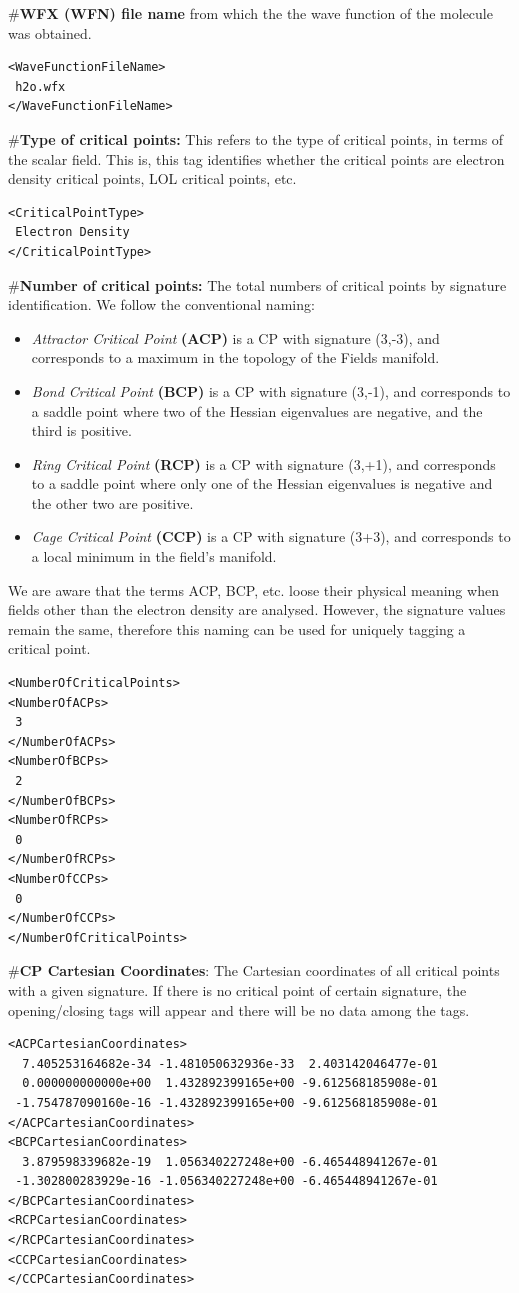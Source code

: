 \#\textbf{WFX (WFN) file name} from which the the wave function of the molecule was obtained.
\begin{verbatim}
<WaveFunctionFileName>
 h2o.wfx
</WaveFunctionFileName>
\end{verbatim}
\#\textbf{Type of critical points:} This refers to the type of critical points, in terms of the scalar field. This is, this tag identifies whether the critical points are electron density critical points, LOL critical points, etc.
\begin{verbatim}
<CriticalPointType>
 Electron Density
</CriticalPointType>
\end{verbatim}
\#\textbf{Number of critical points:} The total numbers of critical points by signature identification.
We follow the conventional naming:
\begin{itemize}
   \item \textit{Attractor Critical Point} \textbf{(ACP)} is a CP with signature (3,-3), and corresponds to a maximum in the topology of the Fields manifold.
   \item \textit{Bond Critical Point} \textbf{(BCP)} is a CP with signature (3,-1), and corresponds to a saddle point where two of the Hessian eigenvalues are negative, and the third is positive.
   \item \textit{Ring Critical Point} \textbf{(RCP)} is a CP with signature (3,+1), and corresponds to a saddle point where only one of the Hessian eigenvalues is negative and the other two are positive.
   \item \textit{Cage Critical Point} \textbf{(CCP)} is a CP with signature (3+3), and corresponds to a local minimum in the field's manifold.
\end{itemize}
We are aware that the terms ACP, BCP, etc. loose their physical meaning when fields other than the electron density are analysed. However, the signature values remain the same, therefore this naming can be used for uniquely tagging a critical point.
\begin{verbatim}
<NumberOfCriticalPoints>
<NumberOfACPs>
 3
</NumberOfACPs>
<NumberOfBCPs>
 2
</NumberOfBCPs>
<NumberOfRCPs>
 0
</NumberOfRCPs>
<NumberOfCCPs>
 0
</NumberOfCCPs>
</NumberOfCriticalPoints>
\end{verbatim}
\#\textbf{CP Cartesian Coordinates}: The Cartesian coordinates of all critical points with a given signature. If there is no critical point of certain signature, the opening/closing tags will appear and there will be no data among the tags.
\begin{verbatim}
<ACPCartesianCoordinates>
  7.405253164682e-34 -1.481050632936e-33  2.403142046477e-01
  0.000000000000e+00  1.432892399165e+00 -9.612568185908e-01
 -1.754787090160e-16 -1.432892399165e+00 -9.612568185908e-01
</ACPCartesianCoordinates>
<BCPCartesianCoordinates>
  3.879598339682e-19  1.056340227248e+00 -6.465448941267e-01
 -1.302800283929e-16 -1.056340227248e+00 -6.465448941267e-01
</BCPCartesianCoordinates>
<RCPCartesianCoordinates>
</RCPCartesianCoordinates>
<CCPCartesianCoordinates>
</CCPCartesianCoordinates>
\end{verbatim}
